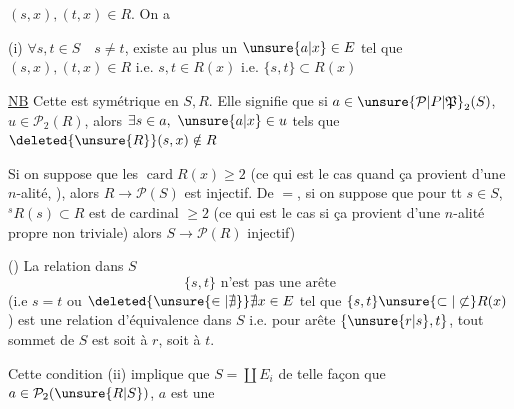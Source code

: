 $(s,x),(t,x)\in R$. On a

(i) $\forall s,t\in S\quad s\ne t$, existe au plus un $\unsure{a|x}\in E$
tel que $(s,x),(t,x)\in R$ i.e. $s,t\in R(x)$ i.e.
$\{s,t\}\subset R(x)$

\margin{\deleted{[\uline{NB} Cette condition est symétrique en $S,R$ elle signifie en fait \unsure{soit|si $s\ne t$} $x\ne y$ $(s,t\in S,\ x,y\in R)$ alors il existe au moins un $\{s,t\}$ \unsure{$s\mapsto x$}}}

\uline{NB} Cette  est symétrique en $S,R$. Elle
signifie que si $a\in\unsure{\mathcal P|P|\mathfrak P}_2(S)$, $u\in\mathcal P_2(R)$,
alors $\exists s\in a,\ \unsure{a|x}\in u$ tels que $\deleted{\unsure{R}}(s,x)\notin R$

Si on suppose que les  $\operatorname{card}R(x)\geq2$
 (ce qui est le cas quand ça provient
d'une  $n$-alité, ), alors
$R\longrightarrow\mathcal P(S)$ est injectif. De $=$, si on
suppose que pour tt $s\in S$, $ {}^{s}\!R(s)\subset R$ est
de cardinal $\geq2$ (ce qui est le cas si
ça provient d'une $n$-alité propre non triviale)
alors $S\longrightarrow\mathcal P(R)$ injectif)

() La relation dans $S$
\[
\{s,t\}\text{ n'est pas une arête}
\]
(i.e $s=t$ ou $\deleted{\unsure{\in|\nexists}}\nexists x\in E$ tel que $\{s,t\}\unsure{\subset|\not\subset}R(x)$)
est une relation d'équivalence dans $S$
i.e. pour  arête $\{\unsure{r|s},t\}$, tout
sommet de $S$ est  soit à $r$, soit
à $t$.

Cette condition (ii) implique que $S=\coprod E_i$
de telle façon que  $a\in\mathcal P_2(\unsure{R|S})$, $a$ est une
